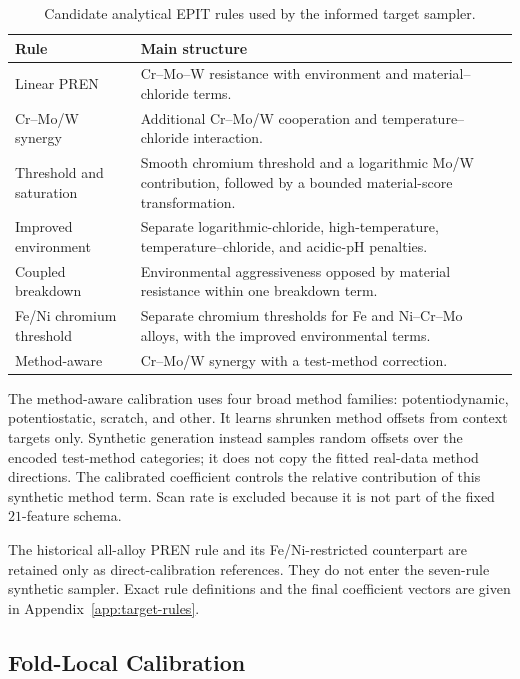 \documentclass{article}
\begin{document}
\begin{table}[htbp]
\centering
\caption{Candidate analytical EPIT rules used by the informed target sampler.}
\label{tab:rule-families}
\small
\begin{tabularx}{\linewidth}{lL}
\toprule
Rule & Main structure \\
\midrule
Linear PREN & Cr--Mo--W resistance with environment and
material--chloride terms. \\
Cr--Mo/W synergy & Additional Cr--Mo/W cooperation and
temperature--chloride interaction. \\
Threshold and saturation & Smooth chromium threshold and a logarithmic
Mo/W contribution, followed by a bounded material-score transformation. \\
Improved environment & Separate logarithmic-chloride,
high-temperature, temperature--chloride, and acidic-pH penalties. \\
Coupled breakdown & Environmental aggressiveness opposed by material
resistance within one breakdown term. \\
Fe/Ni chromium threshold & Separate chromium thresholds for Fe and
Ni--Cr--Mo alloys, with the improved environmental terms. \\
Method-aware & Cr--Mo/W synergy with a test-method correction. \\
\bottomrule
\end{tabularx}
\end{table}

The method-aware calibration uses four broad method families:
potentiodynamic, potentiostatic, scratch, and other. It learns shrunken method
offsets from context targets only. Synthetic generation instead samples
random offsets over the encoded test-method categories; it does not copy the
fitted real-data method directions. The calibrated coefficient controls the
relative contribution of this synthetic method term. Scan rate is excluded
because it is not part of the fixed \(21\)-feature schema.

The historical all-alloy PREN rule and its Fe/Ni-restricted counterpart are
retained only as direct-calibration references. They do not enter the seven-rule
synthetic sampler. Exact rule definitions and the final coefficient vectors
are given in Appendix~\ref{app:target-rules}.

\subsection{Fold-Local Calibration}
\label{sec:rule-calibration}
\end{document}
